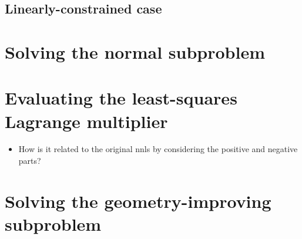 \subsection{Linearly-constrained case}

\section{Solving the normal subproblem}
\label{sec:cobyqa-normal}

\section{Evaluating the least-squares Lagrange multiplier}
\label{sec:cobyqa-lagrange-multipliers}

\begin{itemize}
    \item How is it related to the original \gls{nnls} by considering the positive and negative parts?
\end{itemize}

\section{Solving the geometry-improving subproblem}
\label{sec:cobyqa-geometry-improving}
